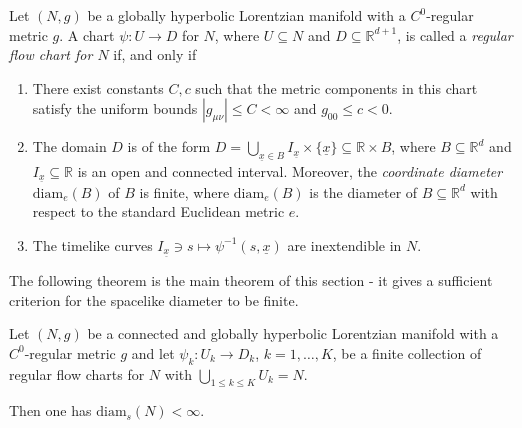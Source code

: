 \documentclass[reqno]{article}
\newcommand{\R}{\mathbb{R}}
\newcommand{\diam}{\mathrm{diam}}
\newcommand{\ux}{\underline{x}}
\begin{document}
\begin{definition}
\label{DefRegFlowChart}
Let $(N,g)$ be a globally hyperbolic Lorentzian manifold with a $C^0$-regular metric $g$. A chart $\psi : U \to D$ for $N$, where $U \subseteq N$ and $D \subseteq \R^{d+1}$, is called a \emph{regular flow chart for $N$} if, and only if
\begin{enumerate}
\item There exist constants $C, c$ such that the metric components in this chart satisfy the uniform bounds $|g_{\mu \nu} | \leq C < \infty$ and $g_{00} \leq c < 0$.
\item The domain $D$ is of the form $D = \bigcup_{ \ux \in B} I_{\ux} \times \{\ux\} \subseteq \R \times B$, where $B \subseteq \R^d$ and $I_{\ux} \subseteq \R$ is an open and connected interval. Moreover, the \emph{coordinate diameter} $\diam_e(B)$ of $B$ is finite, where $\diam_e(B)$ is the diameter of $B \subseteq \R^d$ with respect to the standard Euclidean metric $e$.
\item The timelike curves $I_{\ux} \ni s \mapsto \psi^{-1}(s, \ux)$ are inextendible in $N$.
\end{enumerate}
\end{definition}

The following theorem is the main theorem of this section - it gives a sufficient criterion for the spacelike diameter to be finite.

\begin{theorem}
\label{DiamFinite}
Let $(N,g)$ be a connected and globally hyperbolic Lorentzian manifold with a $C^0$-regular metric $g$ and let $\psi_k : U_k \to D_k$, $k = 1, \ldots, K$, be a finite collection of regular flow charts for $N$ with $\bigcup_{1 \leq k \leq K} U_k = N$.

Then one has $\diam_s(N) < \infty$.
\end{theorem}
\end{document}
